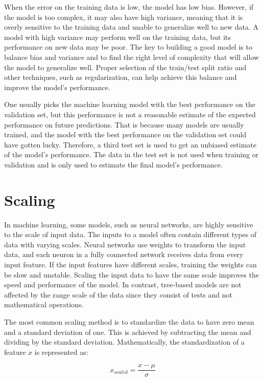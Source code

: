 When the error on the training data is low, the model has low bias.
However, if the model is too complex, it may also have high variance, meaning that it is overly sensitive to the training data and unable to generalize well to new data.
A model with high variance may perform well on the training data, but its performance on new data may be poor.
The key to building a good model is to balance bias and variance and to find the right level of complexity that will allow the model to generalize well.
Proper selection of the train/test split ratio and other techniques, such as regularization, can help achieve this balance and improve the model's performance.

One usually picks the machine learning model with the best performance on the validation set, but this performance is not a reasonable estimate of the expected performance on future predictions.
That is because many models are usually trained, and the model with the best performance on the validation set could have gotten lucky.
Therefore, a third test set is used to get an unbiased estimate of the model's performance.
The data in the test set is not used when training or validation and is only used to estimate the final model's performance.


\section{Scaling}
In machine learning, some models, such as neural networks, are highly sensitive to the scale of input data.
The inputs to a model often contain different types of data with varying scales.
Neural networks use weights to transform the input data, and each neuron in a fully connected network receives data from every input feature.
If the input features have different scales, training the weights can be slow and unstable.
Scaling the input data to have the same scale improves the speed and performance of the model.
In contrast, tree-based models are not affected by the range scale of the data since they consist of tests and not mathematical operations.

The most common scaling method is to standardize the data to have zero mean and a standard deviation of one. This is achieved by subtracting the mean and dividing by the standard deviation.
Mathematically, the standardization of a feature $x$ is represented as:

\begin{equation}
x_{scaled} = \frac{x - \mu}{\sigma}
\end{equation}

